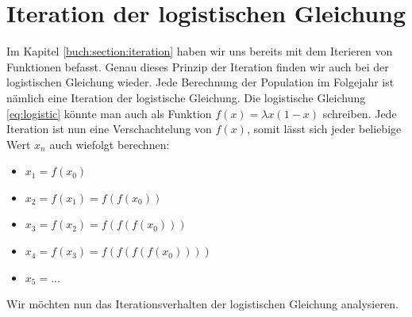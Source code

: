 %
%
%
\section{Iteration der logistischen Gleichung
\label{logistic:section:problemstellung}}

Im Kapitel \ref{buch:section:iteration} haben wir uns
bereits mit dem Iterieren von Funktionen befasst. 
Genau dieses Prinzip der Iteration finden wir auch bei
der logistischen Gleichung wieder. 
Jede Berechnung der Population im Folgejahr ist nämlich
eine Iteration der logistische Gleichung.
Die logistische Gleichung \ref{eq:logistic} könnte man 
auch als Funktion $f(x) = \lambda x(1-x)$ schreiben.
Jede Iteration ist nun eine Verschachtelung von $f(x)$,
somit lässt sich jeder beliebige Wert $x_n$ auch wiefolgt berechnen:
\begin{itemize}
    \item $x_1 = f(x_0)$
    \item $x_2 = f(x_1) = f(f(x_0))$
    \item $x_3 = f(x_2) = f(f(f(x_0)))$
    \item $x_4 = f(x_3) = f(f(f(f(x_0))))$
    \item $x_5 = ...$
\end{itemize}
Wir möchten nun das Iterationsverhalten der logistischen
Gleichung analysieren.

